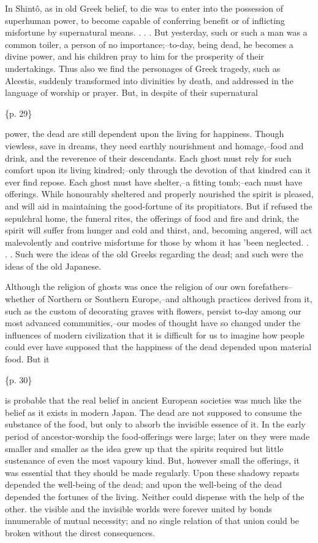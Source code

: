 In Shintô, as in old Greek belief, to die was to enter into the possession of superhuman power, to become capable of conferring benefit or of inflicting misfortune by supernatural means. . . . But yesterday, such or such a man was a common toiler, a person of no importance;--to-day, being dead, he becomes a divine power, and his children pray to him for the prosperity of their undertakings. Thus also we find the personages of Greek tragedy, such as Alcestis, suddenly transformed into divinities by death, and addressed in the language of worship or prayer. But, in despite of their supernatural

\{p. 29\}

power, the dead are still dependent upon the living for happiness. Though viewless, save in dreams, they need earthly nourishment and homage,--food and drink, and the reverence of their descendants. Each ghost must rely for such comfort upon its living kindred;--only through the devotion of that kindred can it ever find repose. Each ghost must have shelter,--a fitting tomb;--each must have offerings. While honourably sheltered and properly nourished the spirit is pleased, and will aid in maintaining the good-fortune of its propitiators. But if refused the sepulchral home, the funeral rites, the offerings of food and fire and drink, the spirit will suffer from hunger and cold and thirst, and, becoming angered, will act malevolently and contrive misfortune for those by whom it has 'been neglected. . . . Such were the ideas of the old Greeks regarding the dead; and such were the ideas of the old Japanese.



Although the religion of ghosts was once the religion of our own forefathers--whether of Northern or Southern Europe,--and although practices derived from it, such as the custom of decorating graves with flowers, persist to-day among our most advanced communities,--our modes of thought have so changed under the influences of modern civilization that it is difficult for us to imagine how people could ever have supposed that the happiness of the dead depended upon material food. But it

\{p. 30\}

is probable that the real belief in ancient European societies was much like the belief as it exists in modern Japan. The dead are not supposed to consume the substance of the food, but only to absorb the invisible essence of it. In the early period of ancestor-worship the food-offerings were large; later on they were made smaller and smaller as the idea grew up that the spirits required but little sustenance of even the most vapoury kind. But, however small the offerings, it was essential that they should be made regularly. Upon these shadowy repasts depended the well-being of the dead; and upon the well-being of the dead depended the fortunes of the living. Neither could dispense with the help of the other. the visible and the invisible worlds were forever united by bonds innumerable of mutual necessity; and no single relation of that union could be broken without the direst consequences.

